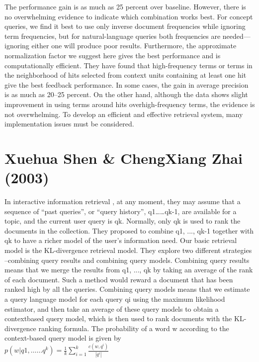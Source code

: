The performance gain is as much as 25 percent over baseline. However, there is no overwhelming evidence to indicate which combination works best. For concept queries, we find it best to use only inverse document frequencies while ignoring term frequencies, but for natural-language queries both frequencies are needed— ignoring either one will produce poor results. Furthermore, the approximate normalization factor we suggest here gives the best performance and is computationally efficient. They have found that high-frequency terms or terms in the neighborhood of hits selected from context units containing at least one hit give the best feedback performance. In some cases, the gain in average precision is as much as 20–25 percent. On the other hand, although the data shows slight improvement in using terms around hits overhigh-frequency terms, the evidence is not overwhelming. To develop an efficient and effective retrieval system, many implementation issues must be considered.



\section{Xuehua Shen \& ChengXiang Zhai (2003)}

In interactive information retrieval \cite{shen2003exploiting}, at any moment, they  may assume that a sequence of “past queries”, or “query history”, q1……qk-1, are available for a topic, and the current user query is qk. Normally, only qk is used to rank the documents in the collection. They proposed to combine q1, ..., qk-1 together with qk to have a richer model of the user’s information need. Our basic retrieval model is the KL-divergence retrieval model. 
They explore two different strategies –combining query results and combining query models. Combining query results means that we merge the results from q1, ..., qk by taking an average of the rank of each document. Such a method would reward a document that has been ranked high by all the queries. Combining query models means that we estimate a query language model for each query qi using the maximum likelihood estimator, and then take an average of these query models to obtain a contextbased query model, which is then used to rank documents with the KL-divergence ranking formula.
The probability of a word w according to the context-based query model is given by\\


\(p(w|q1,……q^k) = \frac{1}{k}\sum_{i=1}^{k}\frac{c(w,q^i)}{|q^i|}\)\\

